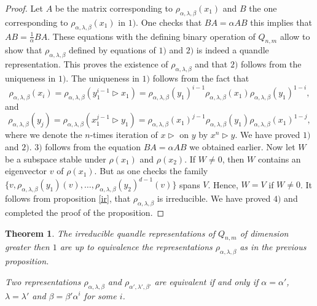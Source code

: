 \documentclass[12pt, reqno]{amsart}
\newtheorem{theorem}{Theorem}[section]
\begin{document}
\begin{proof}
Let $A$ be the matrix corresponding to $\rho_{\alpha,\lambda,\beta}(x_1)$ and $B$ the one corresponding to $\rho_{\alpha,\lambda,\beta}(x_1)$ in $1)$. One checks that $BA=\alpha AB$ this implies that $AB=\frac{1}{\alpha}BA$. These equations with the defining binary operation of $Q_{n,m}$ allow to show that $\rho_{\alpha,\lambda,\beta}$ defined by equations of $1)$ and $2)$ is indeed a quandle representation. This proves the existence of $\rho_{\alpha,\lambda,\beta}$ and that $2)$ follows from the uniqueness in $1)$. The uniqueness in $1)$ follows from the fact that 
$$\rho_{\alpha,\lambda,\beta}(x_i)=\rho_{\alpha,\lambda,\beta}(y_1^{i-1}\triangleright x_1)=\rho_{\alpha,\lambda,\beta}(y_1)^{i-1}\rho_{\alpha,\lambda,\beta}(x_1)\rho_{\alpha,\lambda,\beta}(y_1)^{1-i},$$
and $$\rho_{\alpha,\lambda,\beta}(y_j)=\rho_{\alpha,\lambda,\beta}(x_1^{j-1}\triangleright y_1)=\rho_{\alpha,\lambda,\beta}(x_1)^{j-1}\rho_{\alpha,\lambda,\beta}(y_1)\rho_{\alpha,\lambda,\beta}(x_1)^{1-j},$$
where we denote the $n$-times iteration of $x\triangleright$ on $y$ by $x^n\triangleright y$. We have proved $1)$ and $2)$. $3)$ follows from the equation $BA=\alpha AB$ we obtained earlier. Now let $W$ be a subspace stable under $\rho(x_1)$ and $\rho(x_2)$. If $W\neq 0$, then $W$ contains an eigenvector $v$ of $\rho(x_1)$. But as one checks the family $\{v,\rho_{\alpha,\lambda,\beta}(y_1)(v),\dots,\rho_{\alpha,\lambda,\beta}(y_2)^{d-1}(v) \}$ spans $V$. Hence, $W=V$ if $W\neq 0$. It follows from proposition \ref{ir}, that $\rho_{\alpha,\lambda,\beta}$ is irreducible. We have proved $4)$ and completed the proof of the proposition.
\end{proof}
\begin{theorem}
\item[1)] The irreducible quandle representations of $Q_{n,m}$ of dimension greater then $1$ are up to equivalence the representations $\rho_{\alpha,\lambda,\beta}$ as in the previous proposition. 
\item[2)] Two representations $\rho_{\alpha,\lambda,\beta}$ and $\rho_{\alpha',\lambda',\beta'}$ are equivalent if and only if $\alpha=\alpha'$, $\lambda = \lambda'$ and  $\beta=\beta'\alpha^i$ for some $i$.
\end{theorem}
\end{document}
